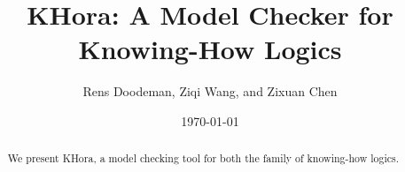 \documentclass[12pt,a4paper]{article}
\title{\textsf{KHora}: A Model Checker for Knowing-How Logics}
\author{Rens Doodeman, Ziqi Wang, and Zixuan Chen}
\date{\today}
\begin{document}
\maketitle

\begin{abstract}
We present \textsf{KHora}, a model checking tool for both the family of knowing-how logics.
\end{abstract}

\vspace{2cm} 
\tableofcontents

\clearpage


%



% 




% 







\end{document}
